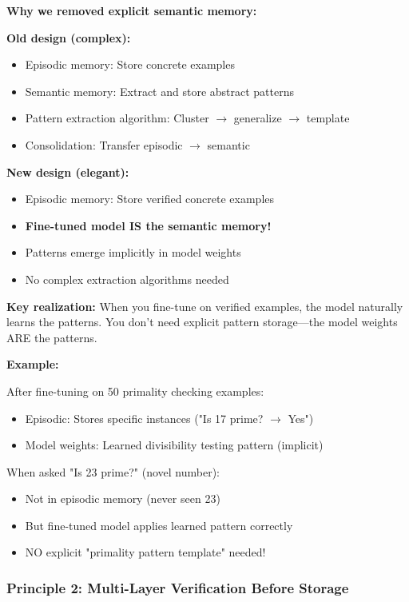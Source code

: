 \documentclass[12pt,a4paper]{article}
\theoremstyle{definition}
\begin{document}
\begin{whybox}
\textbf{Why we removed explicit semantic memory:}

\textbf{Old design (complex):}
\begin{itemize}
    \item Episodic memory: Store concrete examples
    \item Semantic memory: Extract and store abstract patterns
    \item Pattern extraction algorithm: Cluster $\rightarrow$ generalize $\rightarrow$ template
    \item Consolidation: Transfer episodic $\rightarrow$ semantic
\end{itemize}

\textbf{New design (elegant):}
\begin{itemize}
    \item Episodic memory: Store verified concrete examples
    \item \textbf{Fine-tuned model IS the semantic memory!}
    \item Patterns emerge implicitly in model weights
    \item No complex extraction algorithms needed
\end{itemize}

\textbf{Key realization:} When you fine-tune on verified examples, the model naturally learns the patterns. You don't need explicit pattern storage—the model weights ARE the patterns.

\textbf{Example:}

After fine-tuning on 50 primality checking examples:
\begin{itemize}
    \item Episodic: Stores specific instances ("Is 17 prime? $\rightarrow$ Yes")
    \item Model weights: Learned divisibility testing pattern (implicit)
\end{itemize}

When asked "Is 23 prime?" (novel number):
\begin{itemize}
    \item Not in episodic memory (never seen 23)
    \item But fine-tuned model applies learned pattern correctly
    \item NO explicit "primality pattern template" needed!
\end{itemize}
\end{whybox}

\subsubsection{Principle 2: Multi-Layer Verification Before Storage}
\end{document}
